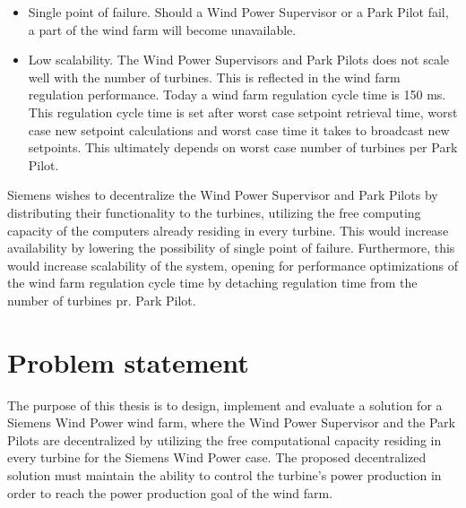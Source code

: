 \begin{itemize} 
	\item Single point of failure. Should a Wind Power Supervisor or a Park Pilot fail, a part of the wind farm will become unavailable.
	\item Low scalability. The Wind Power Supervisors and Park Pilots does not scale well with the number of turbines. This is reflected in the wind farm regulation performance. Today a wind farm regulation cycle time is 150 ms. This regulation cycle time is set after worst case setpoint retrieval time, worst case new setpoint calculations and worst case time it takes to broadcast new setpoints. This ultimately depends on worst case number of turbines per Park Pilot.
\end{itemize}

Siemens wishes to decentralize the Wind Power Supervisor and Park Pilots by distributing their functionality to the turbines, utilizing the free computing capacity of the computers already residing in every turbine. This would increase availability by lowering the possibility of single point of failure. Furthermore, this would increase scalability of the system, opening for performance optimizations of the wind farm regulation cycle time by detaching regulation time from the number of turbines pr. Park Pilot. 

\section{Problem statement}
\label{sec:problemStatement}

The purpose of this thesis is to design, implement and evaluate a solution for a Siemens Wind Power wind farm, where the Wind Power Supervisor and the Park Pilots are decentralized by utilizing the free computational capacity residing in every turbine for the Siemens Wind Power case. The proposed decentralized solution must maintain the ability to control the turbine's power production in order to reach the power production goal of the wind farm. 

